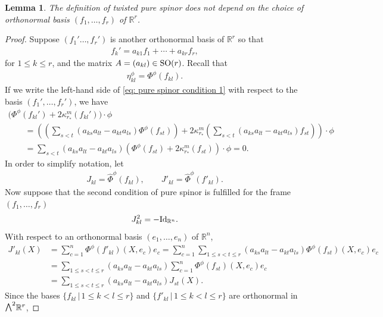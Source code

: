 \documentclass[10pt,a4paper]{amsart}
\newcommand{\ext}{\raise1pt\hbox{\small$\bigwedge$}}
\numberwithin{equation}{section}
\newtheorem{Lemma}[Theorem]{Lemma}
\begin{document}
\begin{Lemma}\label{lemma: independent of frame} The definition of twisted pure spinor does not depend on the choice of orthonormal basis $(f_1,\dots,f_r)$ of $\mathbb{R}^r$.
\end{Lemma}
\begin{proof} Suppose $(f_1'\dots,f_r')$ is another orthonormal basis of $\mathbb{R}^r$ so that
\begin{gather*} f_k' = a_{k1}f_1 + \cdots + a_{kr}f_r ,\end{gather*}
for $1\leq k \leq r$, and the matrix $A=(a_{kl})\in {\rm SO}(r)$.
Recall that
\begin{gather*}\eta_{kl}^\phi = \Phi^\phi(f_{kl}).\end{gather*}
If we write the left-hand side of \eqref{eq: pure spinor condition 1}
 with respect to the basis $(f_1',\dots,f_r')$, we have
\begin{gather*}
 \big(\Phi^\phi(f_{kl}') + 2\kappa_{r_*}^m (f_{kl}')\big)\cdot \phi\\
 \qquad{} = \left(\left(\sum_{s< t}(a_{ks}a_{lt} -a_{kt}a_{ls})
\Phi^\phi(f_{st})\right) + 2\kappa_{r_*}^m \left(\sum_{s< t}(a_{ks}a_{lt} -a_{kt}a_{ls})
f_{st}\right) \right) \cdot \phi\\
\qquad{} = \sum_{s< t}(a_{ks}a_{lt} -a_{kt}a_{ls})
(\Phi^\phi(f_{st}) + 2\kappa_{r_*}^m (f_{st})) \cdot \phi = 0.
\end{gather*}
In order to simplify notation, let
\begin{gather*}
 J_{kl} = \hat\Phi^\phi(f_{kl}), \qquad J'_{kl} = \hat\Phi^\phi(f'_{kl}).
\end{gather*}
Now suppose that the second condition of pure spinor is fulfilled for the frame $(f_1,\dots ,f_r)$
\begin{gather*}
J_{kl}^2= -{\rm Id}_{\mathbb{R}^n}.\end{gather*}
With respect to an orthonormal basis $(e_1,\dots,e_n)$ of $\mathbb{R}^n$,
\begin{align}
J'_{kl}(X) &= \sum_{c=1}^n \Phi^\phi (f'_{kl})(X,e_c)e_c= \sum_{c=1}^n \sum_{1\leq s< t\leq r}(a_{ks}a_{lt} -a_{kt}a_{ls})
\Phi^\phi(f_{st})(X,e_c)e_c\nonumber\\
 &= \sum_{1\leq s< t\leq r}(a_{ks}a_{lt} -a_{kt}a_{ls})\sum_{c=1}^n\Phi^\phi(f_{st})(X,e_c)e_c\nonumber\\
 &= \sum_{1\leq s< t\leq r}(a_{ks}a_{lt} -a_{kt}a_{ls}) \label{eq:J' and J}
J_{st}(X).
\end{align}
Since the bases $\{f_{kl}\,|\,1\leq k< l\leq r\}$ and $\{f'_{kl}\,|\,1\leq k< l\leq r\}$ are orthonormal in $\ext^2 \mathbb{R}^r$,

\end{proof}
\end{document}
